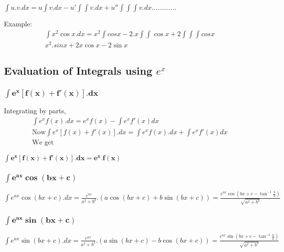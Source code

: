 \begin{tcolorbox}
\begin{center}
$ \int u.v.dx = u \int v.dx - u'\int\int v.dx + u''\int\int\int v.dx.............$
\end{center}
\end{tcolorbox}

\vspace{2mm}
\noindent
Example: \\
\begin{align*}
&\int {x^2}\cos x.dx = x^2 \int cos x - 2.x \int \int \cos x + 2 \int \int \int cos x \\
& x^2.sin x + 2x \cos x - 2 \sin x
\end{align*}

\subsection{Evaluation of Integrals using $ e^x $}
\subsubsection{$ \mathbf{\int e^x[f(x) + f'(x)].dx} $}
Integrating by parts, \\
\begin{align*}
&\int e^xf(x).dx = e^xf(x) - \int e^x f'(x)dx \\
&\text{Now} \int e^x[f(x)+f'(x)].dx = \int e^xf(x).dx + \int e^xf'(x)dx \\
&\text{We get} 
\end{align*}
\vspace{1mm}
\begin{tcolorbox}
\begin{center}
$ \mathbf{\int e^x[ f(x) + f'(x) ].dx = e^x.f(x)} $
\end{center}
\end{tcolorbox}
\subsubsection{$ \mathbf{\int e^{ax}\cos(bx+c)} $}
\begin{tcolorbox}
\begin{center}
$ \int e^{ax} \cos (bx+c).dx = \frac{e^{ax}}{a^2+b^2}.(a \cos (bx+c)+ b \sin (bx+c))
= \frac{e^{ax} \cos \left( bx+c - \tan^{-1}\frac{b}{a} \right)}{\sqrt{a^2+b^2}} $
\end{center}
\end{tcolorbox}
\subsubsection{$ \mathbf{\int e^{ax}\sin(bx+c)} $}
\begin{tcolorbox}
\begin{center}
$ \int e^{ax} \sin (bx+c).dx = \frac{e^{ax}}{a^2+b^2}.(a \sin (bx+c) - b \cos (bx+c))
= \frac{e^{ax} \sin \left( bx+c - \tan^{-1}\frac{b}{a} \right)}{\sqrt{a^2+b^2}} $
\end{center}
\end{tcolorbox}